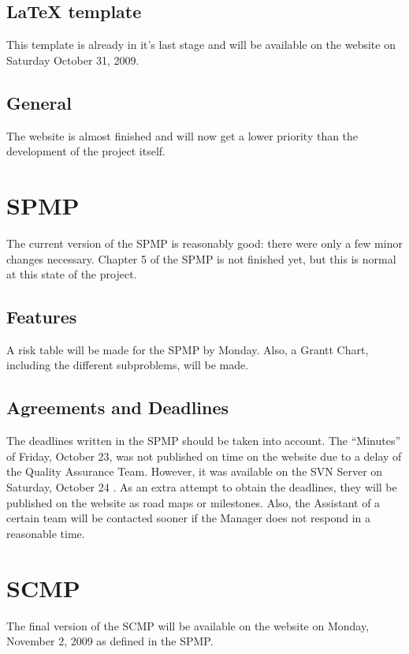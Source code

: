 \documentclass[a4paper, 12pt]{article}
\begin{document}
		\subsection{\LaTeX{} template}
		This template is already in it's last stage and will be available on the website on Saturday October 31, 2009.
		\subsection{General}
The website is almost finished and will now get a lower priority than the development of the project itself.
	\section{SPMP}
The current version of the SPMP is reasonably good: there were only a few minor changes necessary. Chapter 5 of the SPMP is not finished yet, but this is normal at this state of the project.
		\subsection{Features}
A risk table will be made for the SPMP by Monday. Also, a Grantt Chart, including the different subproblems, will be made.
		\subsection{Agreements and Deadlines}
The deadlines written in the SPMP should be taken into account. The ``Minutes'' of Friday, October 23, was not published on time on the website due to a delay of the Quality Assurance Team. However, it was available on the SVN Server on Saturday, October 24 \cite{site1}. 
As an extra attempt to obtain the deadlines, they will be published on the website as road maps or milestones. Also, the Assistant of a certain team will be contacted sooner if the Manager does not respond in a reasonable time.
	\section{SCMP}
The final version of the SCMP will be available on the website on Monday, November 2, 2009 as defined in the SPMP.
\end{document}

